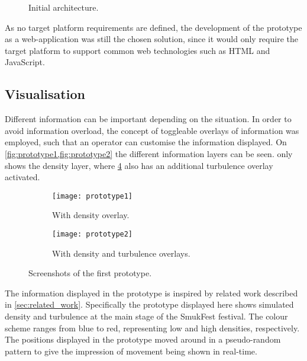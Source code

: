 \begin{figure}[htbp]
    \centering
    \caption{Initial architecture.}
    \label{fig:init_architecture}
\end{figure}

As no target platform requirements are defined, the development of the prototype as a web-application was still the chosen solution, since it would only require the target platform to support common web technologies such as HTML and JavaScript.

\subsection{Visualisation}
Different information can be important depending on the situation. In order to avoid information overload, the concept of toggleable overlays of information was employed, such that an operator can customise the information displayed. On \cref{fig:prototype1,fig:prototype2} the different information layers can be seen.  only shows the density layer, where \cref{fig:prototype2} also has an additional turbulence overlay activated.

\begin{figure}[htbp]
\centering
\begin{subfigure}{.48\textwidth}
    \texttt{[image: prototype1]}
    \caption{With density overlay.}\label{fig:prototype1}
\end{subfigure}
\quad %
\begin{subfigure}{.48\textwidth}
    \texttt{[image: prototype2]}
    \caption{With density and turbulence overlays.}\label{fig:prototype2}
\end{subfigure}
\caption{Screenshots of the first prototype.}
\end{figure}

The information displayed in the prototype is inspired by related work described in \cref{sec:related_work}. Specifically the prototype displayed here shows simulated density and turbulence at the main stage of the SmukFest festival. The colour scheme ranges from blue to red, representing low and high densities, respectively. The positions displayed in the prototype moved around in a pseudo-random pattern to give the impression of movement being shown in real-time.